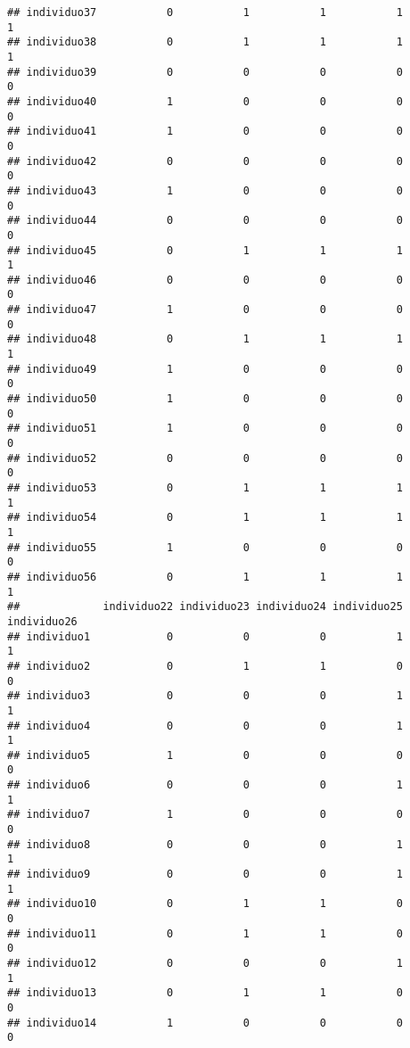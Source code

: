 \documentclass[
]{article}
\begin{document}
\begin{verbatim}
## individuo37           0           1           1           1           1
## individuo38           0           1           1           1           1
## individuo39           0           0           0           0           0
## individuo40           1           0           0           0           0
## individuo41           1           0           0           0           0
## individuo42           0           0           0           0           0
## individuo43           1           0           0           0           0
## individuo44           0           0           0           0           0
## individuo45           0           1           1           1           1
## individuo46           0           0           0           0           0
## individuo47           1           0           0           0           0
## individuo48           0           1           1           1           1
## individuo49           1           0           0           0           0
## individuo50           1           0           0           0           0
## individuo51           1           0           0           0           0
## individuo52           0           0           0           0           0
## individuo53           0           1           1           1           1
## individuo54           0           1           1           1           1
## individuo55           1           0           0           0           0
## individuo56           0           1           1           1           1
##             individuo22 individuo23 individuo24 individuo25 individuo26
## individuo1            0           0           0           1           1
## individuo2            0           1           1           0           0
## individuo3            0           0           0           1           1
## individuo4            0           0           0           1           1
## individuo5            1           0           0           0           0
## individuo6            0           0           0           1           1
## individuo7            1           0           0           0           0
## individuo8            0           0           0           1           1
## individuo9            0           0           0           1           1
## individuo10           0           1           1           0           0
## individuo11           0           1           1           0           0
## individuo12           0           0           0           1           1
## individuo13           0           1           1           0           0
## individuo14           1           0           0           0           0

\end{verbatim}
\end{document}
